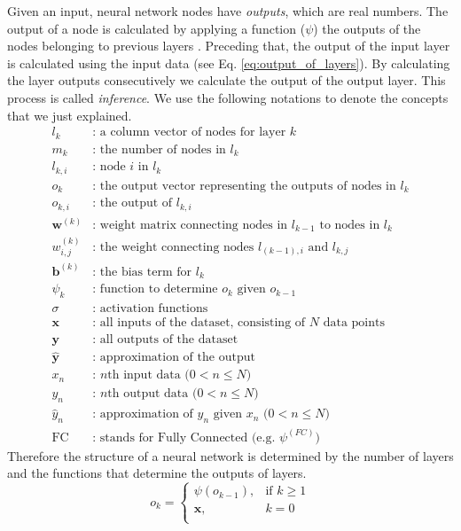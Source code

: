 Given an input, neural network nodes have \textit{outputs}, which are real numbers. The output of a node is calculated by applying a function ($\psi$) the outputs of the nodes belonging to previous layers . Preceding that, the output of the input layer is calculated using the input data (see Eq. \ref{eq:output_of_layers}).  By calculating the layer outputs consecutively we calculate the output of the output layer. This process is called \textit{inference}. We use the following notations to denote the concepts that we just explained.
\begin{equation}
\label{eq:variable_definitions}
\begin{split}
l_k & \text{: a column vector of nodes for layer $k$}\\
m_k & \text{: the number of nodes in $l_k$}\\
l_{k,i}  & \text{: node $i$ in $l_k$}\\
o_{k}  & \text{: the output vector representing the outputs of nodes in $l_{k}$}\\
o_{k,i}  & \text{: the output of $l_{k,i}$}\\
\mathbf{w}^{(k)}  & \text{: weight matrix connecting nodes in $l_{k-1}$ to nodes in $l_{k}$} \\
w^{(k)}_{i,j}  & \text{: the weight connecting nodes $l_{(k-1),i}$ and $l_{k,j}$} \\
\mathbf{b}^{(k)}  & \text{: the bias term for $l_{k}$} \\
\psi_k & \text{: function to determine $o_k$ given $o_{k-1}$}\\
\sigma & \text{: activation functions} \\
\mathbf{x} & \text{: all inputs of the dataset, consisting of $N$ data points} \\
\mathbf{y} & \text{: all outputs of the dataset} \\
\mathbf{\hat y} & \text{: approximation of the output}  \\
x_n & \text{: $n$th input data ($0 < n \leq N$)} \\
y_n & \text{: $n$th output data ($0 < n \leq N$)} \\
\hat y_n & \text{: approximation of $y_n$ given $x_n$ ($0 < n \leq N$)}\\
\text{FC} & \text{: stands for Fully Connected (e.g. $\psi^{(FC)}$)}
\end{split}
\end{equation}
Therefore the structure of a neural network is determined by the number of layers and the functions that determine the outputs of layers.
\begin{equation}
\label{eq:output_of_layers}
    o_k = 
\begin{cases}
    \psi(o_{k-1}), &\text{if } k\geq 1\\
    \mathbf{x},& k = 0\\
\end{cases}
\end{equation}


